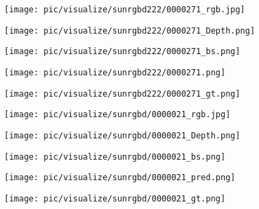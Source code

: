 \documentclass[lettersize,journal]{IEEEtran}
\begin{document}
\begin{figure*}[t]
    \centering
\begin{minipage}[c]{0.158\linewidth}
        \texttt{[image: pic/visualize/sunrgbd222/0000271\_rgb.jpg]}
    \end{minipage}
    \begin{minipage}[c]{0.158\linewidth}
        \texttt{[image: pic/visualize/sunrgbd222/0000271\_Depth.png]}
    \end{minipage} 
    \begin{minipage}[c]{0.158\linewidth}
        \texttt{[image: pic/visualize/sunrgbd222/0000271\_bs.png]}
    \end{minipage} 
    \begin{minipage}[c]{0.158\linewidth}
        \texttt{[image: pic/visualize/sunrgbd222/0000271.png]}
    \end{minipage} 
    \begin{minipage}[c]{0.158\linewidth}
        \texttt{[image: pic/visualize/sunrgbd222/0000271\_gt.png]}
    \end{minipage} 
    
\begin{minipage}[c]{0.158\linewidth}
        \texttt{[image: pic/visualize/sunrgbd/0000021\_rgb.jpg]}
    \end{minipage}
    \begin{minipage}[c]{0.158\linewidth}
        \texttt{[image: pic/visualize/sunrgbd/0000021\_Depth.png]}
    \end{minipage} 
    \begin{minipage}[c]{0.158\linewidth}
        \texttt{[image: pic/visualize/sunrgbd/0000021\_bs.png]}
    \end{minipage} 
    \begin{minipage}[c]{0.158\linewidth}
        \texttt{[image: pic/visualize/sunrgbd/0000021\_pred.png]}
    \end{minipage} 
    \begin{minipage}[c]{0.158\linewidth}
        \texttt{[image: pic/visualize/sunrgbd/0000021\_gt.png]}
    \end{minipage}
    

\end{figure*}
\end{document}
